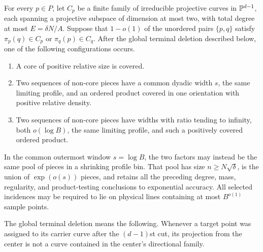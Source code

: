 \begin{proposition}\label{prof:pair-selection}
For every $p\in P$, let $C_p$ be a finite family of irreducible
projective curves in $\mathbb P^{d-1}$, each spanning a projective subspace
of dimension at most two, with total degree at most $E=\delta N/A$.
Suppose that $1-o(1)$ of
the unordered pairs $\{p,q\}$ satisfy $\pi_p(q)\in C_p$ or
$\pi_q(p)\in C_q$.  After the global terminal deletion described
below, one of the following configurations occurs.
\begin{enumerate}
\item A core of positive relative size is covered.
\item Two sequences of non-core pieces have a common dyadic width
$s$, the same limiting profile, and an ordered product covered in
one orientation with positive relative density.
\item Two sequences of non-core pieces have widths with ratio
tending to infinity, both $o(\log B)$, the same limiting profile,
and such a positively covered ordered product.
\end{enumerate}
In the common outermost window $s=\log B$, the two factors may
instead be the same pool of pieces in a shrinking profile bin.
That pool has size $n\ge N\sqrt\delta$, is the union of
$\exp(o(s))$ pieces, and retains all the preceding degree, mass,
regularity, and product-testing conclusions to exponential
accuracy.  All selected incidences may be required to lie on
physical lines containing at most $B^{o(1)}$ sample points.

The global terminal deletion means the following.  Whenever a
target point was assigned to its carrier curve after the
$(d-1)$st cut, its projection from the center is not a curve
contained in the center's directional family.
\end{proposition}

